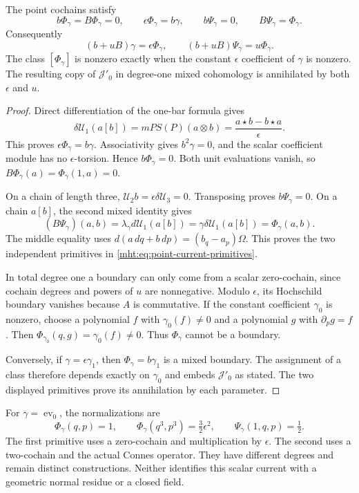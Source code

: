 \begin{theorem}\label{mht:thm:point-current-two-primitives}
The point cochains satisfy
\[
 b\Phi_\gamma=B\Phi_\gamma=0,\qquad
 \epsilon\Phi_\gamma=b\gamma,\qquad
 b\Psi_\gamma=0,\qquad B\Psi_\gamma=\Phi_\gamma.
\]
Consequently
\begin{equation}\label{mht:eq:point-current-primitives}
 (b+uB)\gamma=\epsilon\Phi_\gamma,
 \qquad (b+uB)\Psi_\gamma=u\Phi_\gamma.
\end{equation}
The class $[\Phi_\gamma]$ is nonzero exactly when the
constant $\epsilon$ coefficient of $\gamma$ is nonzero.
The resulting copy of $\mathscr J'_0$ in degree-one mixed
cohomology is annihilated by both $\epsilon$ and $u$.
\end{theorem}
\begin{proof}
Direct differentiation of the one-bar formula gives
\[
 \delta\mathcal U_1(a[b])
       =mP S(P)(a\otimes b)
       =\frac{a\star b-b\star a}{\epsilon}.
\]
This proves $\epsilon\Phi_\gamma=b\gamma$.
Associativity gives $b^2\gamma=0$, and the scalar coefficient
module has no $\epsilon$-torsion. Hence $b\Phi_\gamma=0$.
Both unit evaluations vanish, so
$B\Phi_\gamma(a)=\Phi_\gamma(1,a)=0$.

On a chain of length three,
$\mathcal U_2 b=\epsilon\delta\mathcal U_3=0$.
Transposing proves $b\Psi_\gamma=0$.
On a chain $a[b]$, the second mixed identity gives
\[
 (B\Psi_\gamma)(a,b)
   =\lambda_\gamma d\mathcal U_1(a[b])
   =\gamma\delta\mathcal U_1(a[b])
   =\Phi_\gamma(a,b).
\]
The middle equality uses
$d(a\,dq+b\,dp)=(b_q-a_p)\Omega$.
This proves the two independent primitives in
\eqref{mht:eq:point-current-primitives}.

In total degree one a boundary can only come from a scalar
zero-cochain, since cochain degrees and powers of $u$ are
nonnegative. Modulo $\epsilon$, its Hochschild boundary
vanishes because $A$ is commutative.
If the constant coefficient $\gamma_0$ is nonzero, choose
a polynomial $f$ with $\gamma_0(f)\ne0$ and a polynomial
$g$ with $\partial_pg=f$.
Then $\Phi_{\gamma_0}(q,g)=\gamma_0(f)\ne0$.
Thus $\Phi_\gamma$ cannot be a boundary.

Conversely, if $\gamma=\epsilon\gamma_1$, then
$\Phi_\gamma=b\gamma_1$ is a mixed boundary.
The assignment of a class therefore depends exactly on
$\gamma_0$ and embeds $\mathscr J'_0$ as stated.
The two displayed primitives prove its annihilation by
each parameter.
\end{proof}

For $\gamma=\operatorname{ev}_0$, the normalizations are
\[
 \Phi_\gamma(q,p)=1,\qquad
 \Phi_\gamma(q^3,p^3)=\tfrac32\epsilon^2,\qquad
 \Psi_\gamma(1,q,p)=\tfrac12.
\]
The first primitive uses a zero-cochain and multiplication
by $\epsilon$. The second uses a two-cochain and the actual
Connes operator. They have different degrees and remain
distinct constructions. Neither identifies this scalar
current with a geometric normal residue or a closed field.

